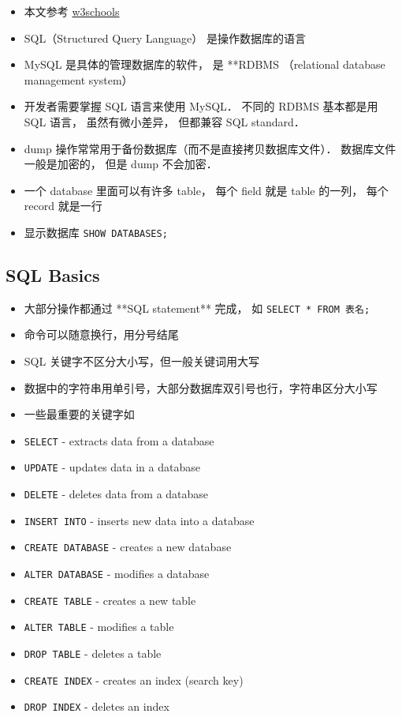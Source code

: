 
\begin{issues}
\issueDraft
\end{issues}

\begin{itemize}
\item 本文参考 \href{https://www.w3schools.com/sql/default.asp}{w3schools}
\item SQL（Structured Query Language） 是操作数据库的语言
\item MySQL 是具体的管理数据库的软件， 是 **RDBMS （relational database management system）
\item 开发者需要掌握 SQL 语言来使用 MySQL． 不同的 RDBMS 基本都是用 SQL 语言， 虽然有微小差异， 但都兼容 SQL standard．
\item dump 操作常常用于备份数据库（而不是直接拷贝数据库文件）． 数据库文件一般是加密的， 但是 dump 不会加密．
\item 一个 database 里面可以有许多 table， 每个 field 就是 table 的一列， 每个 record 就是一行
\item 显示数据库 \verb`SHOW DATABASES;`
\end{itemize}

\subsection{SQL Basics}
\begin{itemize}
\item 大部分操作都通过 **SQL statement** 完成， 如 \verb`SELECT * FROM 表名;`
\item 命令可以随意换行，用分号结尾
\item SQL 关键字不区分大小写，但一般关键词用大写
\item 数据中的字符串用单引号，大部分数据库双引号也行，字符串区分大小写
\item 一些最重要的关键字如
\item \verb`SELECT` - extracts data from a database
\item \verb`UPDATE` - updates data in a database
\item \verb`DELETE` - deletes data from a database
\item \verb`INSERT INTO` - inserts new data into a database
\item \verb`CREATE DATABASE` - creates a new database
\item \verb`ALTER DATABASE` - modifies a database
\item \verb`CREATE TABLE` - creates a new table
\item \verb`ALTER TABLE` - modifies a table
\item \verb`DROP TABLE` - deletes a table
\item \verb`CREATE INDEX` - creates an index (search key)
\item \verb`DROP INDEX` - deletes an index
\end{itemize}

